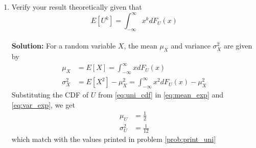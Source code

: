 \documentclass[journal,10pt,twocolumn]{IEEEtran}
\providecommand{\sbrak}[1]{\ensuremath{{}\left[#1\right]}}
\newcommand{\solution}{\noindent \textbf{Solution: }}
\begin{document}
\begin{enumerate}
\item Verify your result theoretically given that
%
\begin{equation}
E\sbrak{U^k} = \int_{-\infty}^{\infty}x^kdF_{U}(x)
\end{equation}\\
\solution For a random variable $X$, the mean $\mu_X$ and variance $\sigma_X^2$ are given by
\begin{align}
	\label{eq:mean_exp}
	\mu_X &= E\sbrak{X} = \int_{-\infty}^{\infty}xdF_{U}(x) \\
	\label{eq:var_exp}
	\sigma_X^2 &= E\sbrak{X^2} - \mu_X^2 = \int_{-\infty}^{\infty}x^2dF_{U}(x) - \mu_X^2
\end{align}  
Substituting the CDF of $U$ from \eqref{eq:uni_cdf} in \eqref{eq:mean_exp} and \eqref{eq:var_exp}, we get
\begin{align}
	\label{eq:mean_uni}
	\mu_U &= \frac{1}{2} \\
	\label{eq:var_uni}
	\sigma_U^2 &= \frac{1}{12}
\end{align}  
which match with the values printed in problem \ref{prob:print_uni}
\end{enumerate}
\end{document}
